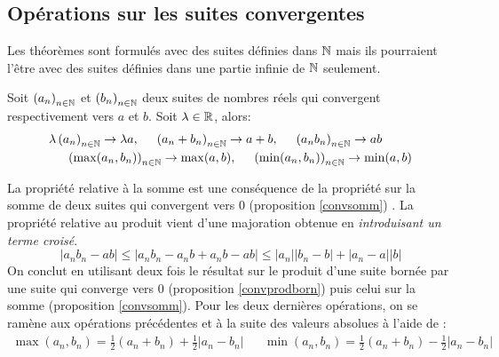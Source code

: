 \subsection{Opérations sur les suites convergentes}
Les théorèmes sont formulés avec des suites définies dans $\mathbb{N}$ mais ils pourraient l'être avec des suites définies dans une partie infinie de $\mathbb{N}$ seulement.
\begin{propn}
Soit $\left( a_n\right) _{n\in \mathbb{N}}$ et $\left( b_n\right) _{n\in \mathbb{N}}$ deux suites de nombres réels qui convergent respectivement  vers $a$ et $b$. Soit $\lambda\in \mathbb{R}$, alors:
\begin{align*}
 &\lambda\left( a_n\right) _{n\in \mathbb{N}}\rightarrow \lambda a, \hspace{0.5cm}\left( a_n +b_n\right) _{n\in \mathbb{N}}\rightarrow a+b
 , \hspace{0.5cm}\left( a_n b_n\right) _{n\in \mathbb{N}}\rightarrow ab \\
 & \hspace{0.5cm}\left( \max(a_n,b_n)\right) _{n\in \mathbb{N}}\rightarrow \max(a,b)
 , \hspace{0.5cm}\left( \min(a_n,b_n)\right) _{n\in \mathbb{N}}\rightarrow \min(a,b)
\end{align*} 
\end{propn}
\begin{demo}
La propriété relative à la somme est une conséquence de la propriété sur la somme de deux suites qui convergent vers 0 (proposition \ref{convsomm}) .\newline
La propriété relative au produit vient d'une majoration obtenue en \emph{introduisant un terme croisé}.
\begin{displaymath}
 \vert a_nb_n - ab\vert \leq \vert a_n b_n -a_n b + a_n b - ab\vert \leq
|a_n||b_n - b| + |a_n - a||b|
\end{displaymath}
On conclut en utilisant deux fois le résultat sur le produit d'une suite bornée par une suite qui converge vers $0$ (proposition \ref{convprodborn}) puis celui sur la somme (proposition \ref{convsomm}).\newline
Pour les deux dernières opérations, on se ramène aux opérations précédentes et à la suite des valeurs absolues à l'aide de :
\begin{align*}
 \max(a_n,b_n) = \frac{1}{2}(a_n+b_n)+\frac{1}{2}|a_n-b_n|& &
 \min(a_n,b_n) = \frac{1}{2}(a_n+b_n)-\frac{1}{2}|a_n-b_n|
\end{align*}
\end{demo}
